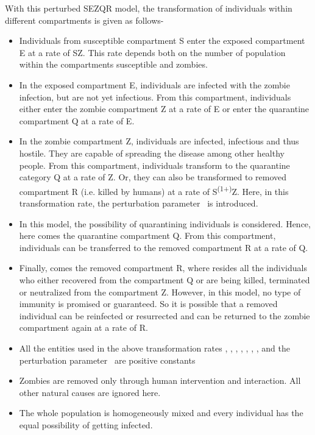 With this perturbed SEZQR model, the transformation of individuals within different compartments is given as follows-
\begin{itemize}
	\item Individuals from susceptible compartment S enter the exposed compartment E at a rate of  \textbeta SZ. This rate depends both on the number of population within the compartments susceptible and zombies.

	\item In the exposed compartment E, individuals are infected with the zombie infection, but are not yet infectious. From this compartment, individuals either enter the zombie compartment Z at a rate of \textrho E or enter the quarantine compartment Q at a rate of \textkappa E.
	
	\item 	In the zombie compartment Z, individuals are infected, infectious and thus hostile. They are capable of spreading the disease among other healthy people. From this compartment, individuals transform to the quarantine category Q at a rate of \textsigma Z. Or, they can also be transformed to removed compartment R (i.e. killed by humans) at a rate of \textalpha S\textsuperscript{(1+\textmu)}Z. Here, in this transformation rate, the perturbation parameter \textmu \ is introduced.
	
	\item In this model, the possibility of quarantining individuals is considered. Hence, here comes the quarantine compartment Q. From this compartment, individuals can be transferred to the removed compartment R at a rate of \textgamma Q.
	
	\item Finally, comes the removed compartment R, where resides all the individuals who either recovered from the compartment Q or are being killed, terminated or neutralized from the compartment Z. However, in this model, no type of immunity is promised or guaranteed. So it is possible that a removed individual can be reinfected or resurrected and can be returned to the zombie compartment again at a rate of \textzeta R.
	
	\item All the entities used in the above transformation rates \textbeta, \textalpha, \textrho, \textkappa, \textsigma, \textgamma,  \textzeta, and the perturbation parameter \textmu \ are positive constants
	
	\item Zombies are removed only through human intervention and interaction. All other natural causes are ignored here.
	
	\item The whole population is homogeneously mixed and every individual has the equal possibility of getting infected.
\end{itemize}

